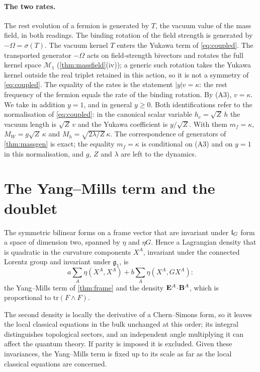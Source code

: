 \paragraph{The two rates.} The rest evolution of a fermion is generated by $T$, the vacuum value of the mass field, in both readings. The
binding rotation of the field strength is generated by $-\Omega=\sigma(T)$. The vacuum kernel $T$ enters the Yukawa term of
\cref{eq:coupled}. The transported generator $-\Omega$ acts on field-strength bivectors and rotates the full kernel space $\mathcal M_1$
(\cref{thm:massfield}(iv)); a generic such rotation takes the Yukawa kernel outside the real triplet retained in this action, so it is not a
symmetry of \cref{eq:coupled}. The equality of the rates is the statement $|y|v=\kappa$: the rest frequency of the fermion equals the rate of
the binding rotation. By (A3), $v=\kappa$. We take in addition $y=1$, and in general $y\ge0$. Both
identifications refer to the normalisation of \cref{eq:coupled}: in the canonical scalar variable $h_c=\sqrt Z\,h$ the vacuum length is
$\sqrt Z\,v$ and the Yukawa coefficient is $y/\sqrt Z$. With them $m_f=\kappa$, $M_W=g\sqrt Z\,\kappa$ and $M_h=\sqrt{2\lambda/Z}\,\kappa$.
The correspondence of generators of \cref{thm:massgen} is exact; the equality $m_f=\kappa$ is conditional on (A3) and on $y=1$ in this
normalisation, and $g$, $Z$ and $\lambda$ are left to the dynamics.

\section{The Yang--Mills term and the doublet}

\begin{theorem}
\label{thm:ymforced}
The symmetric bilinear forms on a frame vector that are invariant under $\mathfrak l_G$ form a space of dimension two, spanned by $\eta$ and $\eta G$.
Hence a Lagrangian density that is quadratic in the curvature components $X^A$, invariant under the connected Lorentz group and invariant
under $\mathfrak g_1$, is
\[
a\sum_A\eta(X^A,X^A)+b\sum_A\eta(X^A,GX^A) :
\]
the Yang--Mills term of \cref{thm:frame} and the density $\mathbf E^A\!\cdot\!\mathbf B^A$, which is proportional to $\mathrm{tr}(F\wedge F)$.
\end{theorem}

The second density is locally the derivative of a Chern--Simons form, so it leaves the local classical equations in the bulk unchanged at
this order; its integral distinguishes topological sectors, and an independent angle multiplying it can affect the quantum theory. If parity
is imposed it is excluded. Given these invariances, the Yang--Mills term is fixed up to its scale as far as the local classical equations
are concerned.

